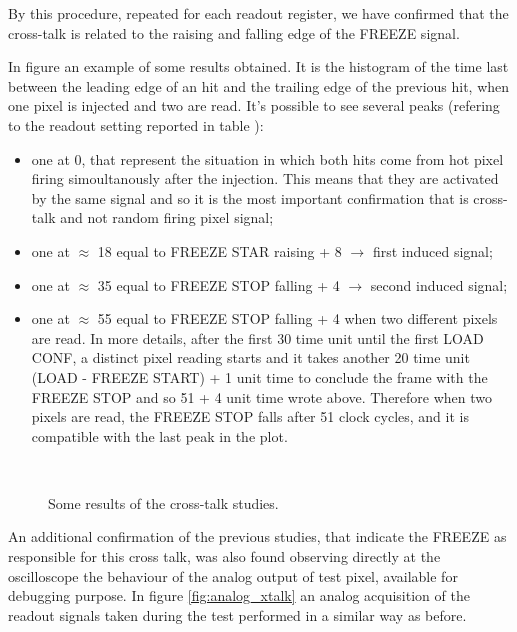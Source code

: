 By this procedure, repeated for each readout register, we have confirmed that the cross-talk is related to the raising and falling edge of the \textsc{FREEZE} signal.

In figure  an example of some results obtained. It is the histogram of the time last between the leading edge of an hit and the trailing edge of the previous hit, when one pixel is injected and two are read. It's possible to see several peaks (refering to the readout setting reported in table ):

\begin{itemize}
\item one at 0, that represent the situation in which both hits come from hot pixel firing simoultanously after the injection. This means that they are activated by the same signal and so it is the most important confirmation that is cross-talk and not random firing pixel signal;
\item one at $\approx$ 18 equal to \textsc{FREEZE STAR} raising + 8 $\rightarrow$ first induced signal;
\item one at $\approx$ 35 equal to \textsc{FREEZE STOP} falling + 4 $\rightarrow$ second induced signal;
\item one at $\approx$ 55 equal to \textsc{FREEZE STOP} falling + 4 when two different pixels are read. In more details, after the first 30 time unit until the first \textsc{LOAD CONF}, a distinct pixel reading starts and it takes another 20 time unit (\textsc{LOAD} - \textsc{FREEZE START}) + 1 unit time to conclude the frame with the \textsc{FREEZE STOP} and so 51 + 4 unit time wrote above. Therefore when two pixels are read, the \textsc{FREEZE STOP} falls after 51 clock cycles, and it is compatible with the last peak in the plot.
\end{itemize}


\begin{figure}[h!]
\centering
{}\quad
{}\\
\caption{Some results of the cross-talk studies.}
\label{fig:xtalk}
\end{figure}

An additional confirmation of the previous studies,  that indicate the FREEZE as responsible for this cross talk, was also found observing directly at the oscilloscope the behaviour of the analog output of test pixel,  available for debugging purpose.    
In figure \autoref{fig:analog_xtalk} an analog acquisition of the readout signals taken during the test performed in a similar way as before. 

